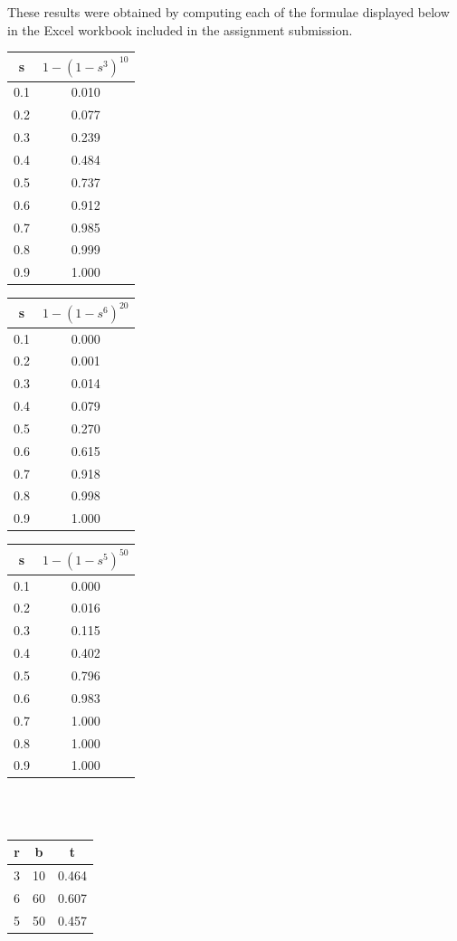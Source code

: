 \documentclass[12t]{article}
\begin{document}
	These results were obtained by computing each of the formulae displayed below in the Excel workbook included in the assignment submission.  \\
	
	\begin{tabular}{cc}
	s & $1-(1-s^3)^{10}$ \\
	\hline
	0.1 & 0.010 \\
	0.2 & 0.077 \\
	0.3 & 0.239 \\
	0.4 & 0.484 \\
	0.5 & 0.737 \\
	0.6 & 0.912 \\
	0.7 & 0.985 \\
	0.8 & 0.999 \\
	0.9 & 1.000 \\
	\hline
	\end{tabular}
	\quad
	\begin{tabular}{cc}
	s & $1-(1-s^6)^{20}$ \\
	\hline
	0.1 & 0.000 \\
	0.2 & 0.001 \\
	0.3 & 0.014 \\
	0.4 & 0.079 \\
	0.5 & 0.270 \\
	0.6 & 0.615 \\
	0.7 & 0.918 \\
	0.8 & 0.998 \\
	0.9 & 1.000 \\
	\hline
	\end{tabular}
	\quad
	\begin{tabular}{cc}
	s & $1-(1-s^5)^{50}$ \\
	\hline
	0.1 & 0.000 \\
	0.2 & 0.016 \\
	0.3 & 0.115 \\
	0.4 & 0.402 \\
	0.5 & 0.796 \\
	0.6 & 0.983 \\
	0.7 & 1.000 \\
	0.8 & 1.000 \\
	0.9 & 1.000 \\
	\hline 
	\end{tabular} \\\\
	
	\begin{tabular}{ccc}
	r & b & t \\
	\hline
	3 & 10 & 0.464 \\
	6 & 60 & 0.607 \\
	5 & 50 & 0.457 \\
	\hline 
	\end{tabular} \\\\
\end{document}
